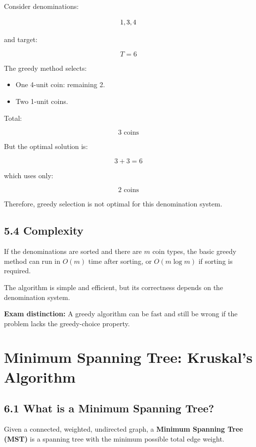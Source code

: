 Consider denominations:


\[
\\{1,3,4\\}
\]


and target:


\[
T=6
\]


The greedy method selects:

\begin{itemize}
    \item One 4-unit coin: remaining 2.
    \item Two 1-unit coins.
\end{itemize}

Total:


\[
\boxed{3\text{ coins}}
\]


But the optimal solution is:


\[
3+3=6
\]


which uses only:


\[
\boxed{2\text{ coins}}
\]


Therefore, greedy selection is not optimal for this denomination system.

\subsection{5.4 Complexity}

If the denominations are sorted and there are $m$ coin types, the basic greedy method can run in $O(m)$ time after sorting, or $O(m\log m)$ if sorting is required.

The algorithm is simple and efficient, but its correctness depends on the denomination system.

\textbf{Exam distinction:} A greedy algorithm can be fast and still be wrong if the problem lacks the greedy-choice property.

\section{Minimum Spanning Tree: Kruskal's Algorithm}

\subsection{6.1 What is a Minimum Spanning Tree?}

Given a connected, weighted, undirected graph, a \textbf{Minimum Spanning Tree (MST)} is a spanning tree with the minimum possible total edge weight.

